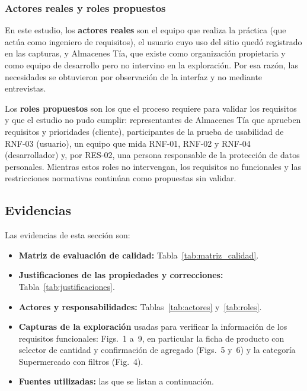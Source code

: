 \documentclass[12pt,a4paper]{article}
\begin{document}
\subsubsection{Actores reales y roles propuestos}

En este estudio, los \textbf{actores reales} son el equipo que
realiza la práctica (que actúa como ingeniero de requisitos), el
usuario cuyo uso del sitio quedó registrado en las capturas, y
Almacenes Tía, que existe como organización propietaria y como
equipo de desarrollo pero no intervino en la exploración. Por
esa razón, las necesidades se obtuvieron por observación de la
interfaz y no mediante entrevistas.

Los \textbf{roles propuestos} son los que el proceso requiere para
validar los requisitos y que el estudio no pudo cumplir:
representantes de Almacenes Tía que aprueben requisitos y
prioridades (cliente), participantes de la prueba de usabilidad
de RNF-03 (usuario), un equipo que mida RNF-01, RNF-02 y RNF-04
(desarrollador) y, por RES-02, una persona responsable de la
protección de datos personales. Mientras estos roles no
intervengan, los requisitos no funcionales y las restricciones
normativas continúan como propuestas sin validar.

\subsection{Evidencias}

Las evidencias de esta sección son:

\begin{itemize}
    \item \textbf{Matriz de evaluación de calidad:}
    Tabla~\ref{tab:matriz_calidad}.
    \item \textbf{Justificaciones de las propiedades y correcciones:}
    Tabla~\ref{tab:justificaciones}.
    \item \textbf{Actores y responsabilidades:}
    Tablas~\ref{tab:actores} y~\ref{tab:roles}.
    \item \textbf{Capturas de la exploración} usadas para verificar
    la información de los requisitos funcionales:
    Figs.~1 a~9, en particular la ficha de
    producto con selector de cantidad y confirmación de agregado
    (Figs.~5 y~6) y la categoría Supermercado
    con filtros (Fig.~4).
    \item \textbf{Fuentes utilizadas:} las que se listan a continuación.
\end{itemize}
\end{document}
